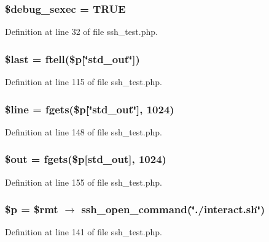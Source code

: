 \subsubsection{\setlength{\rightskip}{0pt plus 5cm}\$debug\_\-sexec = TRUE}\label{ssh__test_8php_a0}




Definition at line 32 of file ssh\_\-test.php.
\subsubsection{\setlength{\rightskip}{0pt plus 5cm}\$last = ftell(\$p[\char`\"{}std\_\-out\char`\"{}])}\label{ssh__test_8php_a3}




Definition at line 115 of file ssh\_\-test.php.
\subsubsection{\setlength{\rightskip}{0pt plus 5cm}\$line = fgets(\$p[\char`\"{}std\_\-out\char`\"{}], 1024)}\label{ssh__test_8php_a6}




Definition at line 148 of file ssh\_\-test.php.
\subsubsection{\setlength{\rightskip}{0pt plus 5cm}\$out = fgets(\$p[std\_\-out], 1024)}\label{ssh__test_8php_a7}




Definition at line 155 of file ssh\_\-test.php.
\subsubsection{\setlength{\rightskip}{0pt plus 5cm}\$p = \$rmt $\rightarrow$ ssh\_\-open\_\-command(\char`\"{}./interact.sh\char`\"{})}\label{ssh__test_8php_a5}




Definition at line 141 of file ssh\_\-test.php.
